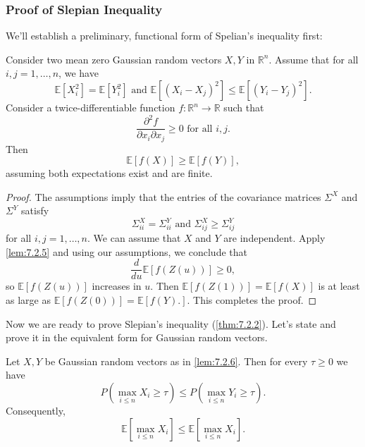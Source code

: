 \subsubsection{Proof of Slepian Inequality}
We'll establish a preliminary, functional form of Spelian's inequality first:

\begin{lemma}
\label{lem:7.2.6}
Consider two mean zero Gaussian random vectors $X, Y$ in $\mathbb{R}^n$. Assume that for all $i, j = 1, \dots
, n$, we have 
\[ \mathbb{E}\left[ X_i^2 \right] = \mathbb{E}\left[ Y_i^2 \right] \text{ and } 
\mathbb{E}\left[ (X_i - X_j)^2 \right] \leq \mathbb{E}\left[ (Y_i - Y_j)^2 \right]. \]
Consider a twice-differentiable function $f: \mathbb{R}^n \to \mathbb{R}$ such that 
\[ \frac{\partial^2 f}{\partial x_i \partial x_j} \geq 0 \text{ for all } i, j. \]
Then 
\[ \mathbb{E}\left[ f(X) \right] \geq \mathbb{E}\left[ f(Y) \right], \]
assuming both expectations exist and are finite.
\end{lemma}

\begin{proof}
The assumptions imply that the entries of the covariance matrices $\Sigma^X$ and $\Sigma^Y$ satisfy 
\[ \Sigma_{ii}^X = \Sigma_{ii}^Y \text{ and } \Sigma_{ij}^X \geq \Sigma_{ij}^Y \]
for all $i, j = 1, \dots, n$. We can assume that $X$ and $Y$ are independent. Apply \cref{lem:7.2.5} and using 
our assumptions, we conclude that 
\[ \frac{d}{du}\mathbb{E}\left[ f(Z(u)) \right] \geq 0, \]
so $\mathbb{E}\left[ f(Z(u)) \right]$ increases in $u$. Then $\mathbb{E}\left[ f(Z(1)) \right] = 
\mathbb{E}\left[ f(X) \right]$ is at least as large as $\mathbb{E}\left[ f(Z(0)) \right] 
= \mathbb{E}\left[ f(Y). \right]$. This completes the proof.
\end{proof}

Now we are ready to prove Slepian's inequality (\cref{thm:7.2.2}). Let's state and prove it in the equivalent 
form for Gaussian random vectors.

\begin{theorem}
\label{thm:7.2.7}
Let $X, Y$ be Gaussian random vectors as in \cref{lem:7.2.6}. Then for every $\tau \geq 0$ we have 
\[ P \left( \max_{i \leq n} X_i \geq \tau \right) \leq P \left( \max_{i \leq n} Y_i \geq \tau \right). \]
Consequently, 
\[ \mathbb{E}\left[ \max_{i \leq n}X_i \right] \leq \mathbb{E}\left[ \max_{i \leq n}X_i \right]. \]
\end{theorem}

